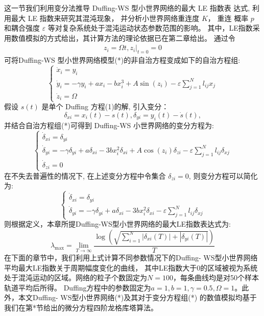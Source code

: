 这一节我们利用变分法推导 Duffing-WS 型小世界网络的最大 LE 指数表 达式, 利用最大 LE 指数来研究其混沌现象，
并分析小世界网络重连度 $K$， 重连 概率 $p$ 和耦合强度 $\varepsilon$ 等对复杂系统处于混沌运动状态参数范围的影响。
其中，LE指数采用数值模拟的方式给出，其计算方法的理论依据已在第二章给出。
通过令
\begin{eqnarray*}
z_i=\Omega t,\left. z_i\right|_{t=0}=0
\end{eqnarray*}
可将Duffing-WS 型小世界网络模型(*)的非自治方程变成如下的自治方程组:
 \begin{equation}
    \left\{\begin{array}{l}
    \dot{x}_i=y_i \\
    \dot{y}_i=-\gamma y_i+a x_i-b x_i^3+A \sin \left(z_i\right)-\varepsilon \sum_{j=1}^N l_{i j} x_j \\
    \dot{z}_i=\Omega
    \end{array}\right.
\end{equation}
假设 $s(t)$ 是单个 Duffing 方程(1)的解, 引入变分：
\begin{equation}
    \delta_{x i}=x_i(t)-s(t), \delta_{y i}=y_i(t)-\dot{s}(t),
\end{equation}
并结合自治方程组(*)可得到 Duffing-WS 小世界网络的变分方程为:
\begin{equation}
    \left\{\begin{array}{l}
    \dot{\delta}_{x i}=\delta_{y i} \\
    \dot{\delta}_{y i}=-\gamma \delta_{y i}+a \delta_{x i}-3 b x_i^2 \delta_{x i}+A \cos \left(z_i\right) \delta_{z i}-\varepsilon \sum_{j=1}^N l_{i j} \delta_{x j} \\
    \dot{\delta}_{z i}=0
    \end{array}\right.
\end{equation}
在不失去普遍性的情况下, 在上述变分方程中令集合 $\delta_{z i}=0$, 则变分方程可以简化为:
\begin{equation}
    \left\{\begin{array}{l}
    \dot{\delta}_{x i}=\delta_{y i} \\
    \dot{\delta}_{y i}=-\gamma \delta_{y i}+a \delta_{x i}-3 b x_i^2 \delta_{x i}-\varepsilon \sum_{j=1}^N l_{i j} \delta_{x j}
    \end{array}\right.
\end{equation}
则根据定义，本章所提Duffing-WS型小世界网络的最大LE指数表达式为:
\begin{equation}
    \lambda_{\max }=\lim _{T \rightarrow \infty} \frac{\log \left(\sqrt{\sum_{i=1}^N\left|\delta_{x i}(T)\right|+\left|\delta_{y i}(T)\right|}\right)}{T}
\end{equation}
在下面的章节中，我们利用上式计算不同参数情况下的Duffing- WS型小世界网络平均最大LE指数关于周期幅度变化的曲线，
其中LE指数大于0的区域被视为系统处于混沌运动的区域。网络的粒子个数固定为$N=100$，每条曲线均是对50个样本轨道平均后所得。
Duffing方程中的参数固定为$a=1,b=1,\gamma=0.5,\Omega=1$。此外，本文Duffing- WS型小世界网络(*)及其对于变分方程组(*)
的数值模拟均基于我们在第*节给出的微分方程四阶龙格库塔算法。

